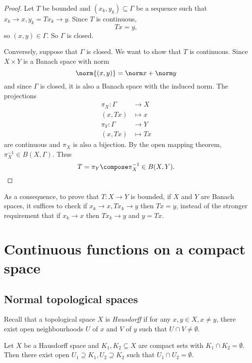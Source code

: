 \documentclass[a4paper]{article}
\begin{document}
\begin{proof}
  Let \(T\) be bounded and \((x_k, y_k) \subseteq \Gamma\) be a sequence such that \(x_k \to x, y_k = Tx_k \to y\). Since \(T\) is continuous,
  \[
    Tx = y,
  \]
  so \((x, y) \in \Gamma\). So \(\Gamma\) is closed.

  Conversely, suppose that \(\Gamma\) is closed. We want to show that \(T\) is continuous. Since \(X \times Y\) is a Banach space with norm
  \[
    \norm{(x, y)} = \norm x + \norm y
  \]
  and since \(\Gamma\) is closed, it is also a Banach space with the induced norm. The projections
  \begin{align*}
    \pi_X: \Gamma &\to X \\
    (x, Tx) &\mapsto x \\
    \pi_Y: \Gamma &\to Y \\
    (x, Tx) &\mapsto Tx
  \end{align*}
  are continuous and \(\pi_X\) is also a bijection. By the open mapping theorem, \(\pi_X^{-1} \in B(X, \Gamma)\). Thus
  \[
    T = \pi_Y \compose \pi_X^{-1} \in B(X, Y).
  \]
\end{proof}

\begin{remark}
  As a consequence, to prove that \(T: X \to Y\) is bounded, if \(X\) and \(Y\) are Banach spaces, it suffices to check if \(x_k \to x, Tx_k \to y\) then \(Tx = y\), instead of the stronger requirement that if \(x_k \to x\) then \(Tx_k \to y\) and \(y = Tx\).
\end{remark}

\section{Continuous functions on a compact space}

\subsection{Normal topological spaces}

Recall that a topological space \(X\) is \emph{Hausdorff} if for any \(x, y \in X, x \neq y\), there exist open neighbourhoods \(U\) of \(x\) and \(V\) of \(y\) such that \(U \cap V \neq \emptyset\).

\begin{proposition}
  Let \(X\) be a Hausdorff space and \(K_1, K_2 \subseteq X\) are compact sets with \(K_1 \cap K_2 = \emptyset\). Then there exist open \(U_1 \supseteq K_1, U_2 \supseteq K_2\) such that \(U_1 \cap U_2 = \emptyset\).
\end{proposition}
\end{document}
